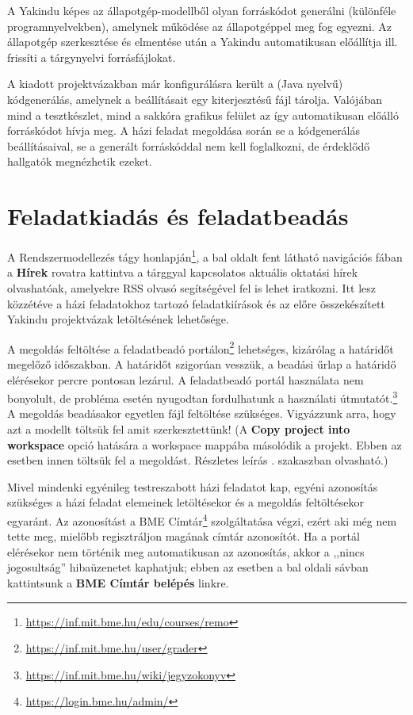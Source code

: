 A Yakindu képes az állapotgép-modellből olyan forráskódot generálni (különféle programnyelvekben), amelynek működése az állapotgéppel meg fog egyezni. Az állapotgép szerkesztése és elmentése után a Yakindu automatikusan előállítja ill. frissíti a tárgynyelvi forrásfájlokat.

A kiadott projektvázakban már konfigurálásra került a (Java nyelvű) kódgenerálás, amelynek a beállításait egy  kiterjesztésű fájl tárolja. Valójában mind a tesztkészlet, mind a sakkóra grafikus felület az így automatikusan előálló forráskódot hívja meg. A házi feladat megoldása során se a kódgenerálás beállításaival, se a generált forráskóddal nem kell foglalkozni, de érdeklődő hallgatók megnézhetik ezeket.

\section{Feladatkiadás és feladatbeadás}
\label{sec:feladatkiadas-es-feladatbeadas}

A Rendszermodellezés tágy honlapján\footnote{\url{https://inf.mit.bme.hu/edu/courses/remo}}, a bal oldalt fent látható navigációs fában a \textbf{Hírek} rovatra kattintva a tárggyal kapcsolatos aktuális oktatási hírek olvashatóak, amelyekre RSS olvasó segítségével fel is lehet iratkozni. Itt lesz közzétéve a házi feladatokhoz tartozó feladatkiírások és az előre összekészített Yakindu projektvázak letöltésének lehetősége.

A megoldás feltöltése a feladatbeadó portálon\footnote{\url{https://inf.mit.bme.hu/user/grader}} lehetséges, kizárólag a határidőt megelőző időszakban. A határidőt szigorúan vesszük, a beadási űrlap a határidő elérésekor percre pontosan lezárul. A feladatbeadó portál használata nem bonyolult, de probléma esetén nyugodtan fordulhatunk a használati útmutatót.\footnote{\url{https://inf.mit.bme.hu/wiki/jegyzokonyv}} A megoldás beadásakor egyetlen  fájl feltöltése szükséges.
Vigyázzunk arra, hogy azt a modellt töltsük fel amit szerkesztettünk!
(A \textbf{Copy project into workspace} opció hatására a workspace mappába másolódik a projekt.
Ebben az esetben innen töltsük fel a megoldást. Részletes leírás . szakaszban olvasható.)

Mivel mindenki egyénileg testreszabott házi feladatot kap, egyéni azonosítás szükséges a házi feladat elemeinek letöltésekor és a megoldás feltöltésekor egyaránt. Az azonosítást a BME Címtár\footnote{\url{https://login.bme.hu/admin/}} szolgáltatása végzi, ezért aki még nem tette meg, mielőbb regisztráljon magának címtár azonosítót. Ha a portál elérésekor nem történik meg automatikusan az azonosítás, akkor a ,,nincs jogosultság'' hibaüzenetet kaphatjuk; ebben az esetben a bal oldali sávban kattintsunk a \textbf{BME Címtár belépés} linkre.
